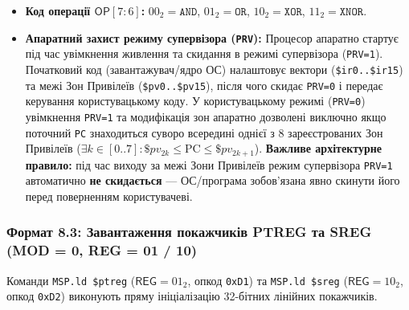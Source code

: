 \documentclass[11pt,a4paper]{article}
\newcommand{\reg}[1]{\texttt{#1}}
\newcommand{\field}[1]{\textsf{#1}}
\begin{document}
\begin{itemize}
  \item \textbf{Код операції $\field{OP} [7:6]$:} $00_2 = \texttt{AND}$, $01_2 = \texttt{OR}$, $10_2 = \texttt{XOR}$, $11_2 = \texttt{XNOR}$.
  \item \textbf{Апаратний захист режиму супервізора (\texttt{PRV}):} Процесор апаратно стартує під час увімкнення живлення та скидання в режимі супервізора (\texttt{PRV=1}). Початковий код (завантажувач/ядро ОС) налаштовує вектори (\texttt{\$ir0..\$ir15}) та межі Зон Привілеїв (\texttt{\$pv0..\$pv15}), після чого скидає \texttt{PRV=0} і передає керування користувацькому коду. У користувацькому режимі (\texttt{PRV=0}) увімкнення \texttt{PRV=1} та модифікація зон апаратно дозволені виключно якщо поточний \reg{PC} знаходиться суворо всередині однієї з 8 зареєстрованих Зон Привілеїв ($\exists k \in [0..7]: \$pv_{2k} \le \text{PC} \le \$pv_{2k+1}$). \textbf{Важливе архітектурне правило:} під час виходу за межі Зони Привілеїв режим супервізора \texttt{PRV=1} автоматично \textbf{не скидається} --- ОС/програма зобов'язана явно скинути його перед поверненням користувачеві.
\end{itemize}

\subsubsection{Формат 8.3: Завантаження покажчиків PTREG та SREG (MOD = 0, REG = 01 / 10)}
Команди \texttt{MSP.ld \$ptreg} ($\field{REG}=01_2$, опкод \texttt{0xD1}) та \texttt{MSP.ld \$sreg} ($\field{REG}=10_2$, опкод \texttt{0xD2}) виконують пряму ініціалізацію 32-бітних лінійних покажчиків.
\end{document}
